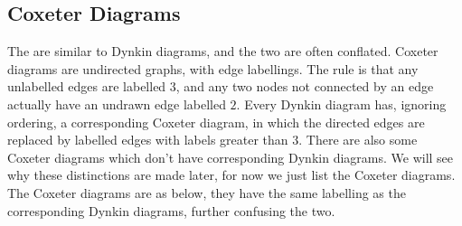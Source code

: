 \subsection{Coxeter Diagrams}
The  are similar to Dynkin diagrams, and the two are often conflated.
Coxeter diagrams are undirected graphs, with edge labellings.
The rule is that any unlabelled edges are labelled \(3\), and any two nodes not connected by an edge actually have an undrawn edge labelled \(2\).
Every Dynkin diagram has, ignoring ordering, a corresponding Coxeter diagram, in which the directed edges are replaced by labelled edges with labels greater than \(3\).
There are also some Coxeter diagrams which don't have corresponding Dynkin diagrams.
We will see why these distinctions are made later, for now we just list the Coxeter diagrams.
The Coxeter diagrams are as below, they have the same labelling as the corresponding Dynkin diagrams, further confusing the two.
\begingroup
\allowdisplaybreaks
